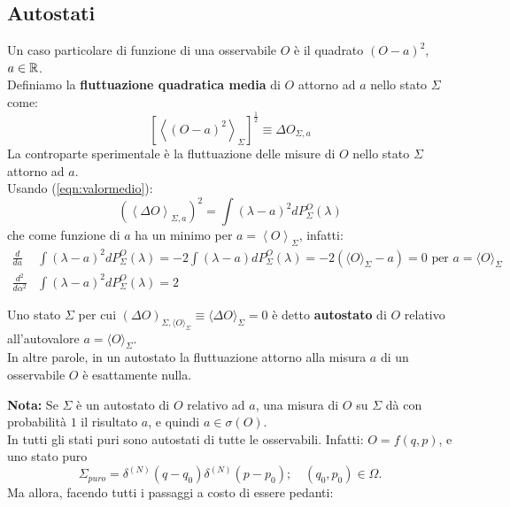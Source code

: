 \documentclass[FisicaTeorica.tex]{subfiles}
\begin{document}
\subsection{Autostati}
Un caso particolare di funzione di una osservabile $O$ è il quadrato $\left(O-a\right)^2$, $a\in\mathbb{R}$.\\
Definiamo la \textbf{fluttuazione quadratica media} di $O$ attorno ad $a$ nello stato $\Sigma$ come:
\[
\left[\left\langle\left(O-a\right)^2\right\rangle_\Sigma\right]^{\frac{1}{2}}\equiv\Delta O_{\Sigma,a}
\]
La controparte sperimentale è la fluttuazione delle misure di $O$ nello stato $\Sigma$ attorno ad $a$.\\
Usando (\ref{eqn:valormedio}):
\begin{equation}
\left(\left\langle\Delta O\right\rangle_{\Sigma,a}\right)^2=\int\left(\lambda-a\right)^2 dP_\Sigma^O\left(\lambda\right)
\label{eqn:fluttuamedia}
\end{equation}
che come funzione di $a$ ha un minimo per $a=\left\langle O\right\rangle_\Sigma$, infatti:
\begin{align*}
    \frac{d}{da}&\int (\lambda-a)^2 dP_\Sigma^O(\lambda) = -2\int (\lambda-a)dP_\Sigma^O(\lambda) = -2(\langle O \rangle_\Sigma -a) = 0 \text{ per } a = \langle O \rangle_\Sigma \\
    \frac{d^2}{d\alpha^2}&\int\left(\lambda-a\right)^2 dP_\Sigma^O\left(\lambda\right)=2
\end{align*}
\begin{dfn}
Uno stato  $\Sigma$ per cui $(\Delta O)_{\Sigma, \langle O \rangle_\Sigma} \equiv \langle \Delta O \rangle_\Sigma = 0$ è detto \textbf{autostato} di $O$ relativo all'autovalore $a = \langle O \rangle_\Sigma$.\\
In altre parole, in un autostato la fluttuazione attorno alla misura $a$ di un osservabile $O$ è esattamente nulla.
\end{dfn}
\textbf{Nota:} Se $\Sigma$ è un autostato di $O$ relativo ad $a$, una misura di $O$ su $\Sigma$ dà con probabilità $1$ il risultato $a$, e quindi $a \in\sigma(O)$.\\
In \textbf{\MC} tutti gli stati puri sono autostati di tutte le osservabili. Infatti: $O=f(q,p)$, e uno stato puro 
\[ \Sigma_{puro}= \delta^{(N)}\left(q-q_0\right)\delta^{\left(N\right)}\left(p-p_0\right); \quad \left(q_0,p_0\right)\in\Omega.
\]
Ma allora, facendo tutti i passaggi a costo di essere pedanti: 
\end{document}
